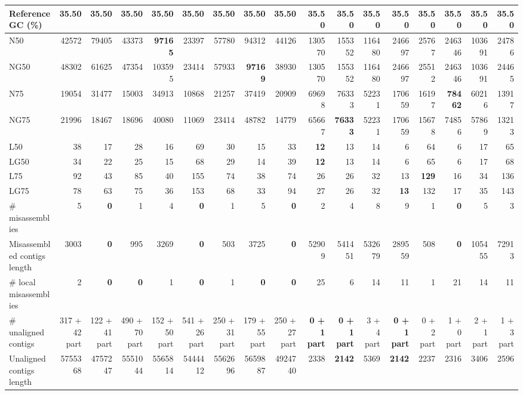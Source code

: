 \documentclass[12pt,a4paper]{article}
\begin{document}
\begin{table}[ht]
\begin{center}
\begin{tabular}{|l*{16}{|r}|}
Reference GC (\%) & 35.50 & 35.50 & 35.50 & 35.50 & 35.50 & 35.50 & 35.50 & 35.50 & 35.50 & 35.50 & 35.50 & 35.50 & 35.50 & 35.50 & 35.50 & 35.50 \\ \hline
N50 & 42572 & 79405 & 43373 & {\bf 97165} & 23397 & 57780 & 94312 & 44126 & 130570 & 155352 & 116480 & 246697 & 25767 & 246346 & 103691 & 24786 \\ \hline
NG50 & 48302 & 61625 & 47354 & 103595 & 23414 & 57933 & {\bf 97169} & 38930 & 130570 & 155352 & 116480 & 246697 & 25512 & 246346 & 103691 & 24465 \\ \hline
N75 & 19054 & 31477 & 15003 & 34913 & 10868 & 21257 & 37419 & 20909 & 69698 & 76333 & 52231 & 170659 & 16197 & {\bf 78462} & 60216 & 13917 \\ \hline
NG75 & 21996 & 18467 & 18696 & 40080 & 11069 & 23414 & 48782 & 14779 & 65667 & {\bf 76333} & 52231 & 170659 & 15678 & 74856 & 57869 & 13213 \\ \hline
L50 & 38 & 17 & 28 & 16 & 69 & 30 & 15 & 33 & {\bf 12} & 13 & 14 & 6 & 64 & 6 & 17 & 65 \\ \hline
LG50 & 34 & 22 & 25 & 15 & 68 & 29 & 14 & 39 & {\bf 12} & 13 & 14 & 6 & 65 & 6 & 17 & 68 \\ \hline
L75 & 92 & 43 & 85 & 40 & 155 & 74 & 38 & 74 & 26 & 26 & 32 & 13 & {\bf 129} & 16 & 34 & 136 \\ \hline
LG75 & 78 & 63 & 75 & 36 & 153 & 68 & 33 & 94 & 27 & 26 & 32 & {\bf 13} & 132 & 17 & 35 & 143 \\ \hline
\# misassemblies & 5 & {\bf 0} & 1 & 4 & {\bf 0} & 1 & 5 & {\bf 0} & 2 & 4 & 8 & 9 & 1 & {\bf 0} & 5 & 3 \\ \hline
Misassembled contigs length & 3003 & {\bf 0} & 995 & 3269 & {\bf 0} & 503 & 3725 & {\bf 0} & 52909 & 541451 & 532679 & 289559 & 508 & {\bf 0} & 105455 & 72913 \\ \hline
\# local misassemblies & 2 & {\bf 0} & {\bf 0} & 1 & {\bf 0} & 1 & {\bf 0} & {\bf 0} & 25 & 6 & 14 & 11 & 1 & 21 & 14 & 11 \\ \hline
\# unaligned contigs & 317 + 42 part & 122 + 41 part & 490 + 70 part & 152 + 50 part & 541 + 26 part & 250 + 31 part & 179 + 55 part & 250 + 27 part & {\bf 0 + 1 part} & {\bf 0 + 1 part} & 3 + 4 part & {\bf 0 + 1 part} & 0 + 2 part & 1 + 0 part & 2 + 1 part & 1 + 3 part \\ \hline
Unaligned contigs length & 5755368 & 4757247 & 5551044 & 5565814 & 5444412 & 5562696 & 5659887 & 4924740 & 2338 & {\bf 2142} & 5369 & {\bf 2142} & 2237 & 2316 & 3406 & 2596 \\ \hline

\end{tabular}
\end{center}
\end{table}
\end{document}
